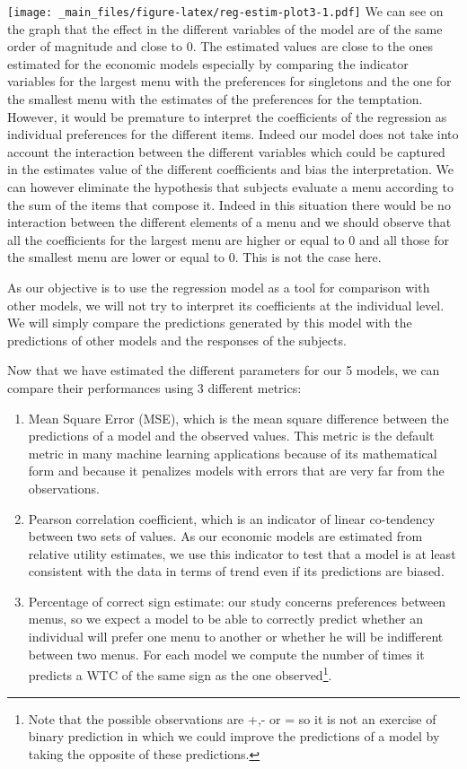 \documentclass[
]{book}
\providecommand{\tightlist}{%
  \setlength{\itemsep}{0pt}\setlength{\parskip}{0pt}}
\begin{document}
\texttt{[image: \_main\_files/figure-latex/reg-estim-plot3-1.pdf]}
We can see on the graph that the effect in the different variables of the model
are of the same order of magnitude and close to 0.
The estimated values are close to the ones estimated for the economic models
especially by comparing the indicator variables for the largest menu with the
preferences for singletons and the one for the smallest menu with the estimates
of the preferences for the temptation. However, it would be premature to
interpret the coefficients of the regression as individual preferences for the
different items.
Indeed our model does not take into account the interaction between the
different variables which could be captured in the estimates value of the
different coefficients and bias the interpretation.
We can however eliminate the hypothesis that subjects evaluate a menu according
to the sum of the items that compose it.
Indeed in this situation there would be no interaction between the different
elements of a menu and we should observe that all the coefficients for the
largest menu are higher or equal to 0 and all those for the smallest menu are
lower or equal to 0. This is not the case here.

As our objective is to use the regression model as a tool for comparison with
other models, we will not try to interpret its coefficients at the individual
level.
We will simply compare the predictions generated by this model with the
predictions of other models and the responses of the subjects.

Now that we have estimated the different parameters for our 5 models, we can
compare their performances using 3 different metrics:

\begin{enumerate}
\def\labelenumi{\arabic{enumi}.}
\tightlist
\item
  Mean Square Error (MSE), which is the mean square difference between the
  predictions of a model and the observed values.
  This metric is the default metric in many machine learning applications because
  of its mathematical form and because it penalizes models with errors that are
  very far from the observations.
\item
  Pearson correlation coefficient, which is an indicator of linear co-tendency
  between two sets of values.
  As our economic models are estimated from relative utility estimates, we use
  this indicator to test that a model is at least consistent with the data in
  terms of trend even if its predictions are biased.
\item
  Percentage of correct sign estimate: our study concerns preferences between
  menus, so we expect a model to be able to correctly predict whether an
  individual will prefer one menu to another or whether he will be indifferent
  between two menus.
  For each model we compute the number of times it predicts a WTC of the same sign
  as the one observed\footnote{Note that the possible observations are +,- or = so it is not an exercise
    of binary prediction in which we could improve the predictions of a model by taking the
    opposite of these predictions.}.
\end{enumerate}
\end{document}

